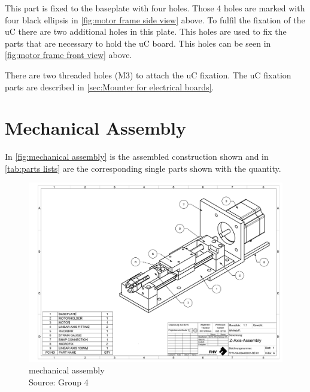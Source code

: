 \documentclass[a4paper,12pt]{scrreprt}
\begin{document}
This part is fixed to the baseplate with four holes. Those 4 holes are marked with four black ellipsis in \autoref{fig:motor frame side view} above. To fulfil the fixation of the \acs{uC} there are two additional holes in this plate. This holes are used to fix the parts that are necessary to hold the \acs{uC} board. This holes can be seen in \autoref{fig:motor frame front view} above.

 
There are two threaded holes (M3) to attach the \acs{uC} fixation. The \acs{uC} fixation parts are described in \autoref{sec:Mounter for electrical boards}.

\section{Mechanical Assembly}
In \autoref{fig:mechanical assembly} is the assembled construction shown and in \autoref{tab:parts lists} are the corresponding single parts shown with the quantity.
 \begin{figure}[H]
  \centering
   \includegraphics[width=1\textwidth]{pictures/psi5321_asseblyAxisGes}
   \caption[mechanical assembly]{mechanical assembly\\
	Source: Group 4  
  }
   \label{fig:mechanical assembly}
\end{figure} 
\end{document}
